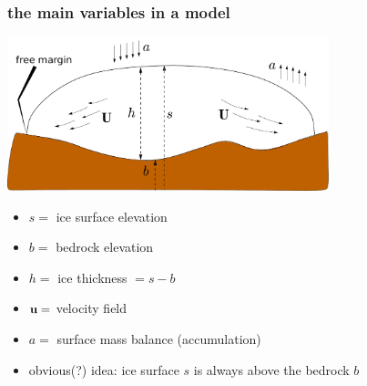 \documentclass[hide notes,intlimits]{beamer}
\begin{document}
\begin{frame}
  \frametitle{the main variables in a model}

\begin{center}
\includegraphics[width=0.7\textwidth]{groundedscheme}
\end{center}

\begin{itemize}
\small
\item $s=$ ice surface elevation
\item $b=$ bedrock elevation
\item $h=$ ice thickness $ = s-b$
\item ${\bf u}=$ velocity field
\item $a=$ surface mass balance (accumulation)

\bigskip
\item obvious(?) idea: ice surface $s$ is always above the bedrock $b$
\end{itemize}

\end{frame}
\end{document}
